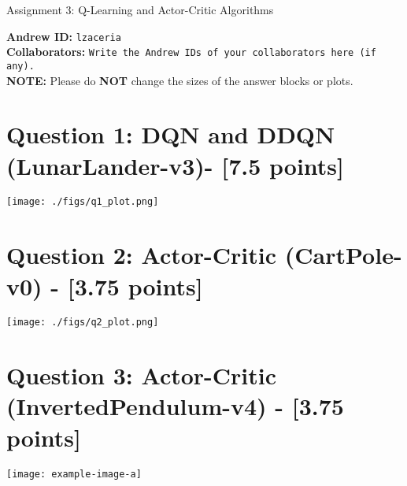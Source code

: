 \documentclass{article}
\begin{document}

\begin{centering}
    {\Large Assignment 3: Q-Learning and Actor-Critic Algorithms
} \\
    \vspace{.25cm}
\end{centering}
\vspace{0.25cm}

\textbf{Andrew ID:} \texttt{lzaceria} \\
\textbf{Collaborators:} \texttt{Write the Andrew IDs of your collaborators here (if any).}\\ 
\textbf{NOTE:} Please do \textbf{NOT} change the sizes of the answer blocks or plots.

\setcounter{section}{0}
\section{Question 1: DQN and DDQN (LunarLander-v3)- [7.5 points]}
\begin{answer}[title=Question 1,height=9.5cm,width=\linewidth]
\centering
\texttt{[image: ./figs/q1\_plot.png]}
\end{answer}

\section{Question 2: Actor-Critic (CartPole-v0) - [3.75 points]}
\begin{answer}[title=Question 2,height=9.5cm,width=\linewidth]
\centering
\texttt{[image: ./figs/q2\_plot.png]}
\end{answer}



\section{Question 3: Actor-Critic (InvertedPendulum-v4) - [3.75 points]}
\begin{answer}[title=Question 3,height=9.5cm,width=\linewidth]
\centering
\texttt{[image: example-image-a]}
\end{answer}
\end{document}
